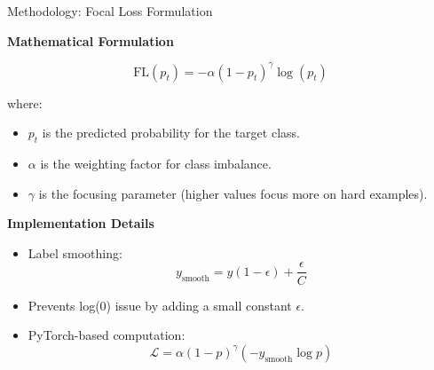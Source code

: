 \begin{frame}{Methodology: Focal Loss Formulation}

    \textbf{\large Mathematical Formulation}
    \vspace{5pt}

    \[
    \text{FL}(p_t) = -\alpha (1 - p_t)^{\gamma} \log(p_t)
    \]

    where:
    \begin{itemize}
        \item \( p_t \) is the predicted probability for the target class.
        \item \( \alpha \) is the weighting factor for class imbalance.
        \item \( \gamma \) is the focusing parameter (higher values focus more on hard examples).
    \end{itemize}

    \vspace{10pt}
    \textbf{\large Implementation Details}
    \vspace{5pt}
    \begin{itemize}
        \item Label smoothing:  
              \[
              y_{\text{smooth}} = y(1 - \epsilon) + \frac{\epsilon}{C}
              \]
        \item Prevents log(0) issue by adding a small constant \( \epsilon \).
        \item PyTorch-based computation:  
              \[
              \mathcal{L} = \alpha (1 - p)^{\gamma} (-y_{\text{smooth}} \log p)
              \]
    \end{itemize}

\end{frame}


